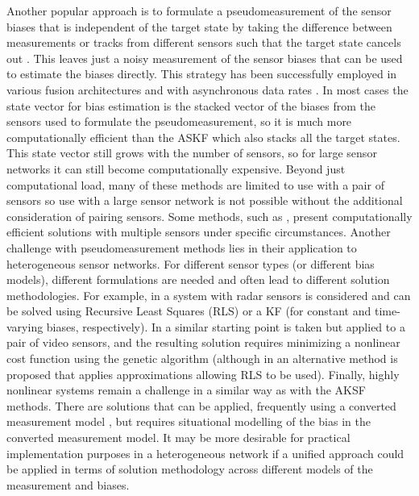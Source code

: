 \documentclass[journal]{IEEEtran}
\begin{document}
Another popular approach is to formulate a pseudomeasurement of the sensor biases that is independent of the target state by taking the difference between measurements or tracks from different sensors such that the target state cancels out \cite{taghavi2016practical, taghavi2020geo, song2021efficient, zhu2015joint}. This leaves just a noisy measurement of the sensor biases that can be used to estimate the biases directly. This strategy has been successfully employed in various fusion architectures \cite{song2021efficient, taghavi2020geo, zhu2015joint, taghavi2016practical} and with asynchronous data rates \cite{taghavi2016practical, yong2016asynchronous}. In most cases the state vector for bias estimation is the stacked vector of the biases from the sensors used to formulate the pseudomeasurement, so it is much more computationally efficient than the ASKF which also stacks all the target states. This state vector still grows with the number of sensors, so for large sensor networks it can still become computationally expensive. Beyond just computational load, many of these methods are limited to use with a pair of sensors \cite{song2021efficient, taghavi2020geo, yong2016asynchronous} so use with a large sensor network is not possible without the additional consideration of pairing sensors. Some methods, such as \cite{taghavi2016practical}, present computationally efficient solutions with multiple sensors under specific circumstances. Another challenge with pseudomeasurement methods lies in their application to heterogeneous sensor networks. For different sensor types (or different bias models), different formulations are needed and often lead to different solution methodologies. For example, in \cite{taghavi2016practical} a system with radar sensors is considered and can be solved using Recursive Least Squares (RLS) or a KF (for constant and time-varying biases, respectively). In \cite{taghavi2020geo} a similar starting point is taken but applied to a pair of video sensors, and the resulting solution requires minimizing a nonlinear cost function using the genetic algorithm (although in \cite{song2021efficient} an alternative method is proposed that applies approximations allowing RLS to be used). Finally, highly nonlinear systems remain a challenge in a similar way as with the AKSF methods. There are solutions that can be applied, frequently using a converted measurement model \cite{taghavi2016practical, taghavi2020geo, song2021efficient}, but requires situational modelling of the bias in the converted measurement model. It may be more desirable for practical implementation purposes in a heterogeneous network if a unified approach could be applied in terms of solution methodology across different models of the measurement and biases.
\end{document}
